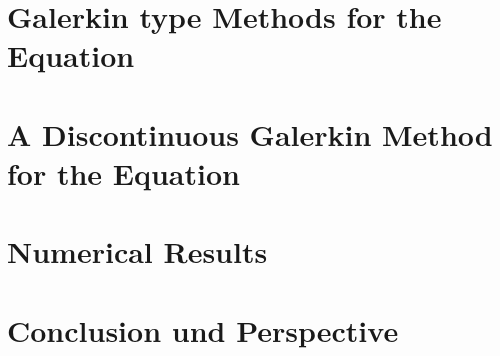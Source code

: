 \documentclass{template}
\begin{document}
\chapter{Galerkin type Methods for the \MA Equation}
\label{ch:DGMongeAmpere}


\chapter{A Discontinuous Galerkin Method for the \MA Equation}
\label{ch:ourMethod}


\chapter{Numerical Results}
\label{ch:NumericalResults}


\chapter{Conclusion und Perspective}
\label{ch:conclusion}



\begin{appendices}

	
\end{appendices}



\newpage
%
\newpage


\end{document}
